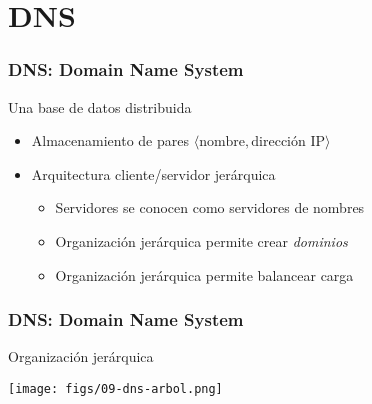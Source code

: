 \documentclass[letter]{beamer}
\begin{document}
\section{DNS}

\begin{frame}
  \frametitle{DNS: Domain Name System}

  Una base de datos distribuida
  \begin{itemize}
    \item Almacenamiento de pares $\langle \text{nombre}, \text{dirección IP} \rangle$
    \item Arquitectura cliente/servidor jerárquica
      \begin{itemize}
        \item Servidores se conocen como servidores de nombres
        \item Organización jerárquica permite crear {\em dominios}
        \item Organización jerárquica permite balancear carga
      \end{itemize}
  \end{itemize}
\end{frame}
\begin{frame}
  \frametitle{DNS: Domain Name System}

  Organización jerárquica
  \begin{center}
    \texttt{[image: figs/09-dns-arbol.png]}
  \end{center}
  
\end{frame}
\end{document}
